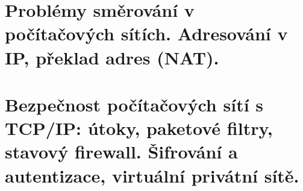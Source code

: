 \documentclass{book}
\begin{document}
\chapter{Problémy směrování v počítačových sítích. Adresování v IP, překlad adres (NAT). }

\clearpage

\chapter{Bezpečnost počítačových sítí s TCP/IP: útoky, paketové filtry, stavový firewall. Šifrování a autentizace, virtuální privátní sítě.  }

\clearpage
\end{document}
